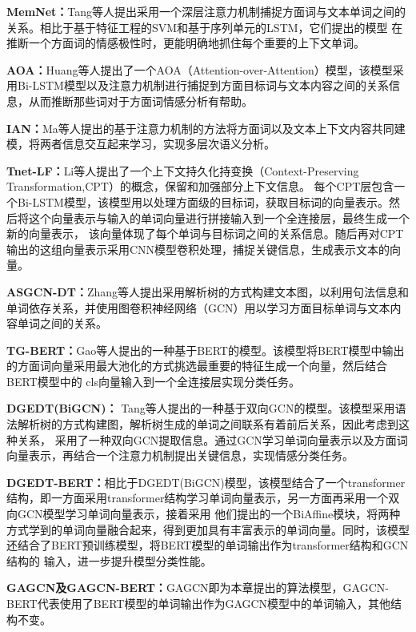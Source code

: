 \textbf{MemNet：}Tang等人提出采用一个深层注意力机制捕捉方面词与文本单词之间的关系。相比于基于特征工程的SVM和基于序列单元的LSTM，它们提出的模型
在推断一个方面词的情感极性时，更能明确地抓住每个重要的上下文单词。

\textbf{AOA：}Huang等人提出了一个AOA（Attention-over-Attention）模型，该模型采用Bi-LSTM模型以及注意力机制进行捕捉到方面目标词与文本内容之间的关系信息，从而推断那些词对于方面词情感分析有帮助。

\textbf{IAN：}Ma等人提出的基于注意力机制的方法将方面词以及文本上下文内容共同建模，将两者信息交互起来学习，实现多层次语义分析。

\textbf{Tnet-LF：}Li等人提出了一个上下文持久化持变换（Context-Preserving Transformation,CPT）的概念，保留和加强部分上下文信息。
每个CPT层包含一个Bi-LSTM模型，该模型用以处理方面级的目标词，获取目标词的向量表示。然后将这个向量表示与输入的单词向量进行拼接输入到一个全连接层，最终生成一个新的向量表示，
该向量体现了每个单词与目标词之间的关系信息。随后再对CPT输出的这组向量表示采用CNN模型卷积处理，捕捉关键信息，生成表示文本的向量。

\textbf{ASGCN-DT：}Zhang等人提出采用解析树的方式构建文本图，以利用句法信息和单词依存关系，并使用图卷积神经网络（GCN）用以学习方面目标单词与文本内容单词之间的关系。

\textbf{TG-BERT：}Gao等人提出的一种基于BERT的模型。该模型将BERT模型中输出的方面词向量采用最大池化的方式挑选最重要的特征生成一个向量，然后结合BERT模型中的
cls向量输入到一个全连接层实现分类任务。

\textbf{DGEDT(BiGCN)：} Tang等人提出的一种基于双向GCN的模型。该模型采用语法解析树的方式构建图，解析树生成的单词之间联系有着前后关系，因此考虑到这种关系，
采用了一种双向GCN提取信息。通过GCN学习单词向量表示以及方面词向量表示，再结合一个注意力机制提出关键信息，实现情感分类任务。

\textbf{DGEDT-BERT：}相比于DGEDT(BiGCN)模型，该模型结合了一个transformer结构，即一方面采用transformer结构学习单词向量表示，另一方面再采用一个双向GCN模型学习单词向量表示，接着采用
他们提出的一个BiAffine模块，将两种方式学到的单词向量融合起来，得到更加具有丰富表示的单词向量。同时，该模型还结合了BERT预训练模型，将BERT模型的单词输出作为transformer结构和GCN结构的
输入，进一步提升模型分类性能。

\textbf{GAGCN及GAGCN-BERT：}GAGCN即为本章提出的算法模型，GAGCN-BERT代表使用了BERT模型的单词输出作为GAGCN模型中的单词输入，其他结构不变。

